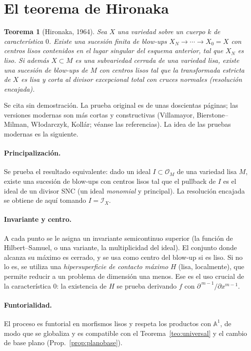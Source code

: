 \documentclass[11pt,a4paper,oneside]{book}
\newcommand{\A}{\mathbb{A}}
\newcommand{\cO}{\mathcal{O}}
\newcommand{\cI}{\mathcal{I}}
\theoremstyle{plain}
\newtheorem{teorema}{Teorema}[chapter]
\theoremstyle{definition}
\theoremstyle{remark}
\begin{document}
\section{El teorema de Hironaka}

\begin{teorema}[Hironaka, 1964]\label{teo:hironaka}
Sea $X$ una variedad sobre un cuerpo $k$ de característica $0$. Existe una sucesión finita de blow-ups $X_N\to\cdots\to X_0=X$ con centros lisos contenidos en el lugar singular del esquema anterior, tal que $X_N$ es liso. Si además $X\subset M$ es una subvariedad cerrada de una variedad lisa, existe una sucesión de blow-ups de $M$ con centros lisos tal que la transformada estricta de $X$ es lisa y corta al divisor excepcional total con cruces normales (resolución encajada).
\end{teorema}

Se cita sin demostración. La prueba original es de unas doscientas páginas; las versiones modernas son más cortas y constructivas (Villamayor, Bierstone--Milman, Włodarczyk, Kollár; véanse las referencias). La idea de las pruebas modernas es la siguiente.

\paragraph{Principalización.} Se prueba el resultado equivalente: dado un ideal $I\subset\cO_M$ de una variedad lisa $M$, existe una sucesión de blow-ups con centros lisos tal que el pullback de $I$ es el ideal de un divisor SNC (un ideal \emph{monomial} y principal). La resolución encajada se obtiene de aquí tomando $I=\cI_X$.

\paragraph{Invariante y centro.} A cada punto se le asigna un invariante semicontinuo superior (la función de Hilbert--Samuel, o una variante, la multiplicidad del ideal). El conjunto donde alcanza su máximo es cerrado, y se usa como centro del blow-up si es liso. Si no lo es, se utiliza una \emph{hipersuperficie de contacto máximo} $H$ (lisa, localmente), que permite reducir a un problema de dimensión una menos. Ese es el uso crucial de la característica $0$: la existencia de $H$ se prueba derivando $f$ con $\partial^{\,m-1}/\partial x^{m-1}$.

\paragraph{Funtorialidad.} El proceso es funtorial en morfismos lisos y respeta los productos con $\A^1$, de modo que se globaliza y es compatible con el Teorema~\ref{teo:universal} y el cambio de base plano (Prop.~\ref{prop:planobase}).
\end{document}
